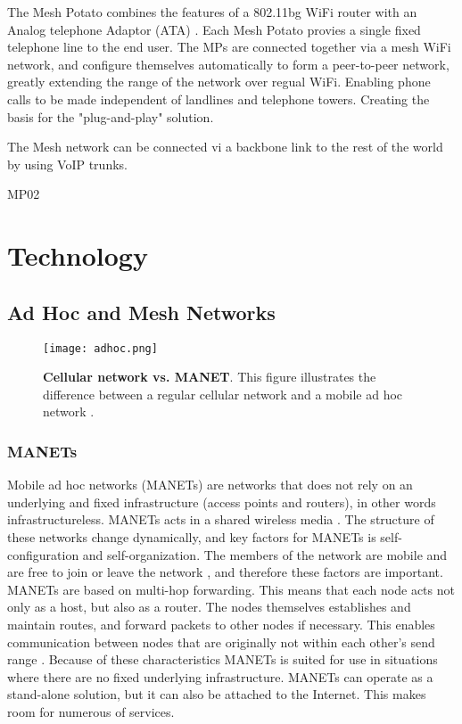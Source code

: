 The Mesh Potato combines the features of a 802.11bg WiFi router with an Analog telephone Adaptor (ATA) \cite{MP}. Each Mesh Potato provies a single fixed telephone line to the end user. The MPs are connected together via a mesh WiFi network, and  configure themselves automatically to form a peer-to-peer network, greatly extending the range of the network over regual WiFi. Enabling phone calls to be made independent of landlines and telephone towers. Creating the basis for the "plug-and-play" solution. 








The Mesh network can be connected vi a backbone link to the rest of the world by using VoIP trunks. 


MP02





\section{Technology}

\subsection{Ad Hoc and Mesh Networks}

\begin{figure}[h!]
  \centering
    \texttt{[image: adhoc.png]}
     \caption [Cellular network vs. MANET]{\textbf{Cellular network vs. MANET}. This figure illustrates the difference between a regular cellular network and a mobile ad hoc network \cite{adhoc2}.}
\label{fig:adhoc}
\end{figure}

\subsubsection{MANETs} Mobile ad hoc networks (MANETs) are networks that does not rely on an underlying and fixed infrastructure (access points and routers), in other words infrastructureless. MANETs acts in a shared wireless media \cite{adhoc}. The structure of these networks change dynamically, and key factors for MANETs is self-configuration and self-organization. The members of the network are mobile and are free to join or leave the network \cite{adhoc2}, and therefore these factors are important. MANETs are based on multi-hop forwarding. This means that each node acts not only as a host, but also as a router. The nodes themselves establishes and maintain routes, and forward packets to other nodes if necessary. This enables communication between nodes that are originally not within each other's send range \cite{adhoc2}. Because of these characteristics MANETs is suited for use in situations where there are no fixed underlying infrastructure. MANETs can operate as a stand-alone solution, but it can also be attached to the Internet. This makes room for numerous of services. 

